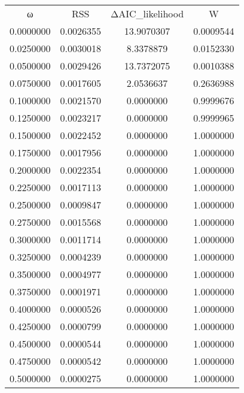 \begin{tabular}{cccc}
ω & RSS & ΔAIC_likelihood & W\\
0.0000000 & 0.0026355 & 13.9070307 & 0.0009544\\
0.0250000 & 0.0030018 & 8.3378879 & 0.0152330\\
0.0500000 & 0.0029426 & 13.7372075 & 0.0010388\\
0.0750000 & 0.0017605 & 2.0536637 & 0.2636988\\
0.1000000 & 0.0021570 & 0.0000000 & 0.9999676\\
0.1250000 & 0.0023217 & 0.0000000 & 0.9999965\\
0.1500000 & 0.0022452 & 0.0000000 & 1.0000000\\
0.1750000 & 0.0017956 & 0.0000000 & 1.0000000\\
0.2000000 & 0.0022354 & 0.0000000 & 1.0000000\\
0.2250000 & 0.0017113 & 0.0000000 & 1.0000000\\
0.2500000 & 0.0009847 & 0.0000000 & 1.0000000\\
0.2750000 & 0.0015568 & 0.0000000 & 1.0000000\\
0.3000000 & 0.0011714 & 0.0000000 & 1.0000000\\
0.3250000 & 0.0004239 & 0.0000000 & 1.0000000\\
0.3500000 & 0.0004977 & 0.0000000 & 1.0000000\\
0.3750000 & 0.0001971 & 0.0000000 & 1.0000000\\
0.4000000 & 0.0000526 & 0.0000000 & 1.0000000\\
0.4250000 & 0.0000799 & 0.0000000 & 1.0000000\\
0.4500000 & 0.0000544 & 0.0000000 & 1.0000000\\
0.4750000 & 0.0000542 & 0.0000000 & 1.0000000\\
0.5000000 & 0.0000275 & 0.0000000 & 1.0000000\\
\end{tabular}
